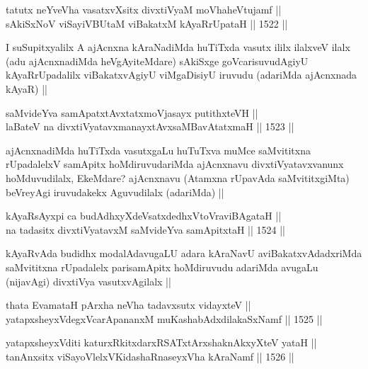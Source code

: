 \begin{shl}
tatutx neYveVha vasatxvXsitx divxtiVyaM moVhaheVtujamf || \\
sAkiSxNoV viSayiVBUtaM viBakatxM kAyaRrUpataH ||  1522 ||  
\end{shl}

\begin{artha}
I suSupitxyalilx A ajAcnxna kAraNadiMda huTiTxda vasutx ililx ilalxveV ilalx (adu ajAcnxnadiMda heVgAyiteMdare) sAkiSxge goVcarisuvudAgiyU kAyaRrUpadalilx viBakatxvAgiyU viMgaDisiyU iruvudu (adariMda ajAcnxnada kAyaR) ||
\end{artha}

\begin{shl}
saMvideYva samApatxtAvxtatxmoVjasayx putithxteVH ||  \\
laBateV na divxtiVyatavxmanayxtAvxsaMBavAtatxmaH ||  1523 ||  
\end{shl}

\begin{artha}
ajAcnxnadiMda huTiTxda vasutxgaLu huTuTxva muMce saMvititxna rUpadalelxV samApitx hoMdiruvudariMda ajAcnxnavu divxtiVyatavxvanunx hoMduvudilalx, EkeMdare? ajAcnxnavu (Atamxna rUpavAda saMvititxgiMta) beVreyAgi iruvudakekx Aguvudilalx (adariMda) ||
\end{artha}

\begin{shl}
kAyaRsAyxpi ca budAdhxyXdeVsatxdedhxVtoVraviBAgataH ||  \\
na tadasitx divxtiVyatavxM saMvideYva samApitxtaH ||  1524 ||  
\end{shl}

\begin{artha}
kAyaRvAda budidhx modalAdavugaLU adara kAraNavU aviBakatxvAdadxriMda saMvititxna rUpadalelx parisamApitx hoMdiruvudu adariMda avugaLu (nijavAgi) divxtiVya vasutxvAgilalx ||
\end{artha}


\begin{shl}
thata EvamataH pArxha neVha tadavxsutx vidayxteV || \\
yatapxsheyxVdegxVcarApananxM muKashabAdxdilakaSxNamf ||  1525 ||  
\end{shl}
				
\begin{shl}
yatapxsheyxVditi katurxRkitxdarxRSATx\s tArx\s \s shaknAkxyXteV yataH ||  \\
tanAnxsitx viSayoVlelxVKidashaRnaseyxVha kAraNamf ||  1526 ||  
\end{shl}

